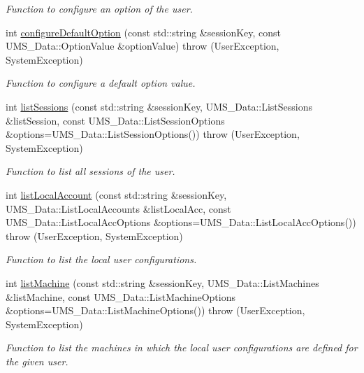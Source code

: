 \begin{DoxyCompactItemize}
\begin{DoxyCompactList}\small\item\em Function to configure an option of the user. \item\end{DoxyCompactList}\item 
int \hyperlink{namespacevishnu_a05878cbc7dbb3f5da87dbc32dd25ab78}{configureDefaultOption} (const std::string \&sessionKey, const UMS\_\-Data::OptionValue \&optionValue)  throw (UserException, SystemException)
\begin{DoxyCompactList}\small\item\em Function to configure a default option value. \item\end{DoxyCompactList}\item 
int \hyperlink{namespacevishnu_adaf9c8ca47f577cf1a0c9effe7bd9c52}{listSessions} (const std::string \&sessionKey, UMS\_\-Data::ListSessions \&listSession, const UMS\_\-Data::ListSessionOptions \&options=UMS\_\-Data::ListSessionOptions())  throw (UserException, SystemException)
\begin{DoxyCompactList}\small\item\em Function to list all sessions of the user. \item\end{DoxyCompactList}\item 
int \hyperlink{namespacevishnu_a05618a81d403ef5c11e014fcecd7ba00}{listLocalAccount} (const std::string \&sessionKey, UMS\_\-Data::ListLocalAccounts \&listLocalAcc, const UMS\_\-Data::ListLocalAccOptions \&options=UMS\_\-Data::ListLocalAccOptions())  throw (UserException, SystemException)
\begin{DoxyCompactList}\small\item\em Function to list the local user configurations. \item\end{DoxyCompactList}\item 
int \hyperlink{namespacevishnu_a59e26ccbe8510d774528c86511f7476b}{listMachine} (const std::string \&sessionKey, UMS\_\-Data::ListMachines \&listMachine, const UMS\_\-Data::ListMachineOptions \&options=UMS\_\-Data::ListMachineOptions())  throw (UserException, SystemException)
\begin{DoxyCompactList}\small\item\em Function to list the machines in which the local user configurations are defined for the given user. \item\end{DoxyCompactList}\item 

\end{DoxyCompactItemize}
